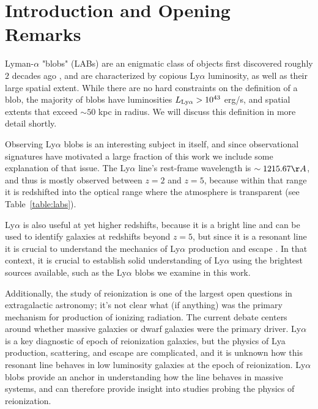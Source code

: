 \chapter{Introduction and Opening Remarks}
\label{sec:intro}

Lyman-$\alpha$ "blobs" (LABs) are an enigmatic class of objects first discovered roughly $2$ decades ago \citep{Fynbo1999,Steidel2000}, and are characterized by copious Ly$\alpha$ luminosity, as well as their large spatial extent.
While there are no hard constraints on the definition of a blob, the majority of blobs have luminosities $L_{\rm{Ly}\alpha} > 10^{43}$ erg/s, and spatial extents that exceed $\sim50$ kpc in radius.
We will discuss this definition in more detail shortly.

Observing Ly$\alpha$ blobs is an interesting subject in itself, and since observational signatures have motivated a large fraction of this work we include some explanation of that issue.
The Ly$\alpha$ line's rest-frame wavelength is $\sim 1215.67 \AA$, and thus is mostly observed between $z=2$ and $z=5$, because within that range it is redshifted into the optical range where the atmosphere is transparent (see Table~\ref{table:labs}).

Ly$\alpha$ is also useful at yet higher redshifts, because it is a bright line and can be used to identify galaxies at redshifts beyond $z=5$, but since it is a resonant line it is crucial to understand the mechanics of Ly$\alpha$ production and escape \citep{Ao2015}.
In that context, it is crucial to establish solid understanding of Ly$\alpha$ using the brightest sources available, such as the Ly$\alpha$ blobs we examine in this work.

Additionally, the study of reionization is one of the largest open questions in extragalactic astronomy; it's not clear what (if anything) was the primary mechanism for production of ionizing radiation.
The current debate centers around whether massive galaxies \citep{Naidu2019} or dwarf galaxies \citep{Finkelstein2019} were the primary driver.
Ly$\alpha$ is a key diagnostic of epoch of reionization galaxies, but the physics of Lya production, scattering, and escape are complicated, and it is unknown how this resonant line behaves in low luminosity galaxies at the epoch of reionization.
Ly$\alpha$ blobs provide an anchor in understanding how the line behaves in massive systems, and can therefore provide insight into studies probing the physics of reionization.

